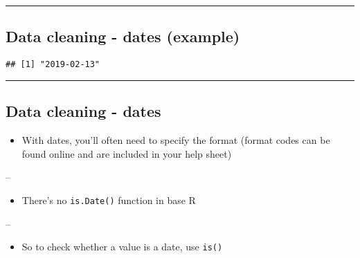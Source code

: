 \documentclass[]{article}
\newenvironment{Shaded}{\begin{snugshade}}{\end{snugshade}}
\newcommand{\DataTypeTok}[1]{\textcolor[rgb]{0.13,0.29,0.53}{#1}}
\newcommand{\DecValTok}[1]{\textcolor[rgb]{0.00,0.00,0.81}{#1}}
\newcommand{\KeywordTok}[1]{\textcolor[rgb]{0.13,0.29,0.53}{\textbf{#1}}}
\newcommand{\NormalTok}[1]{#1}
\newcommand{\StringTok}[1]{\textcolor[rgb]{0.31,0.60,0.02}{#1}}
\providecommand{\tightlist}{%
  \setlength{\itemsep}{0pt}\setlength{\parskip}{0pt}}
\begin{document}
\begin{center}\rule{0.5\linewidth}{\linethickness}\end{center}

\hypertarget{data-cleaning---dates-example-1}{%
\subsection{Data cleaning - dates
(example)}\label{data-cleaning---dates-example-1}}

\begin{Shaded}
\end{Shaded}

\begin{verbatim}
## [1] "2019-02-13"
\end{verbatim}

\begin{center}\rule{0.5\linewidth}{\linethickness}\end{center}

\hypertarget{data-cleaning---dates-2}{%
\subsection{Data cleaning - dates}\label{data-cleaning---dates-2}}

\begin{itemize}
\tightlist
\item
  With dates, you'll often need to specify the format (format codes can
  be found online and are included in your help sheet)
\end{itemize}

--

\begin{itemize}
\tightlist
\item
  There's no \texttt{is.Date()} function in base R
\end{itemize}

--

\begin{itemize}
\tightlist
\item
  So to check whether a value is a date, use \texttt{is()}
\end{itemize}
\end{document}
